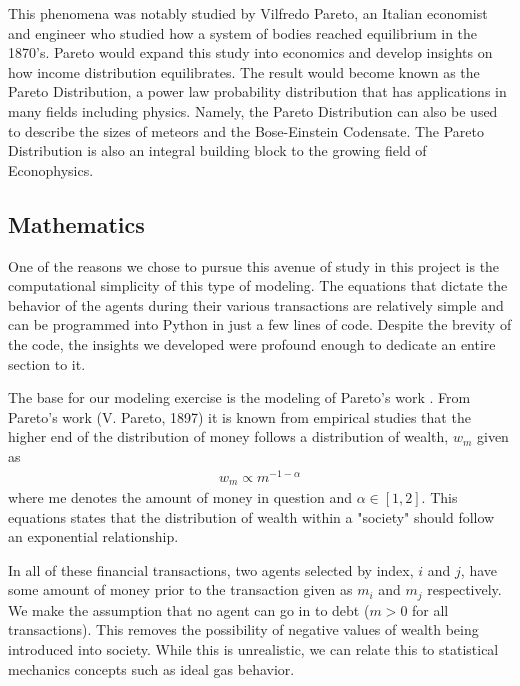 \documentclass[11pt]{article}
\newcommand{\ba}{\[\begin{aligned}}
\newcommand{\ea}{\end{aligned}\]}
\begin{document}
	This phenomena was notably studied by Vilfredo Pareto, an Italian economist and engineer who studied how a system of bodies reached equilibrium in the 1870's. Pareto would expand this study into economics and develop insights on how income distribution equilibrates. The result would become known as the Pareto Distribution, a power law probability distribution that has applications in many fields including physics. Namely, the Pareto Distribution can also be used to describe the sizes of meteors and the Bose-Einstein Codensate. The Pareto Distribution is also an integral building block to the growing field of Econophysics.  \cite{pareto}
	
	\subsection{Mathematics} \label{math}
	One of the reasons we chose to pursue this avenue of study in this project is the computational simplicity of this type of modeling. The equations that dictate the behavior of the agents during their various transactions are relatively simple and can be programmed into Python in just a few lines of code. Despite the brevity of the code, the insights we developed were profound enough to dedicate an entire section to it.
	
	The base for our modeling exercise is the modeling of Pareto's work \cite{pareto}. From Pareto’s work (V. Pareto, 1897) it is known from empirical studies that the higher end of the distribution of money follows a distribution of wealth, $w_m$ given as
	\ba
	w_m \propto m^{-1-\alpha}
	\ea
	where me denotes the amount of money in question and $\alpha \in [1,2]$. This equations states that the distribution of wealth within a "society" should follow an exponential relationship. 
	
	In all of these financial transactions, two agents selected by index, $i$ and $j$, have some amount of money prior to the transaction given as $m_i$ and $m_j$ respectively. We make the assumption that no agent can go in to debt ($m>0$ for all transactions). This removes the possibility of negative values of wealth being introduced into society. While this is unrealistic, we can relate this to statistical mechanics concepts such as ideal gas behavior.
	
\end{document}
